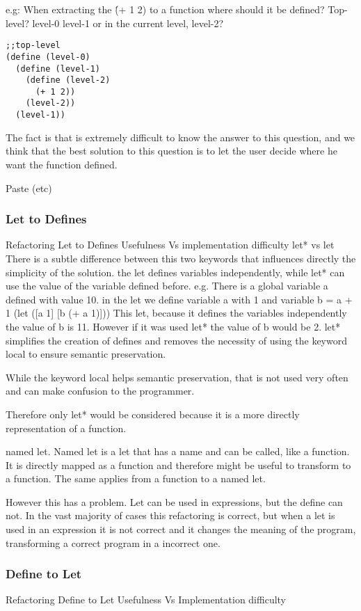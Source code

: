 e.g: When extracting the \'(+ 1 2) to a function where should it be defined?
Top-level? level-0 level-1 or in the current level, level-2?
\begin{lstlisting}[caption="Example"]
;;top-level
(define (level-0)
  (define (level-1)
    (define (level-2)
      (+ 1 2))
    (level-2))
  (level-1))
\end{lstlisting}

The fact is that is extremely difficult to know the answer to this question, and
we think that the best solution to this question is to let the user decide where
he want the function defined.

Paste (etc)

\subsubsection{Let to Defines}
Refactoring Let to Defines Usefulness Vs implementation difficulty
let* vs let
There is a subtle difference between this two keywords that influences directly the simplicity of the solution.
the let defines variables independently, while let* can use the value of the variable defined before.
e.g.
There is a global variable a defined with value 10.
in the let we define variable a with 1 and variable b = a + 1
(let ([a 1]
[b (+ a 1)]))
This let, because it defines the variables independently the value of b is 11.
However if it was used let* the value of b would be 2.
let* simplifies the creation of defines and removes the necessity of using the keyword local to ensure semantic preservation.

While the keyword local helps semantic preservation, that is not used very often and can make confusion to the programmer.

Therefore only let* would be considered because it is a more directly representation of a function.

named let.
Named let is a let that has a name and can be called, like a function.
It is directly mapped as a function and therefore might be useful to transform to a function.
The same applies from a function to a named let.

However this has a problem. Let can be used in expressions, but the define can not.
In the vast majority of cases this refactoring is correct, but when a let is used in an expression
it is not correct and it changes the meaning of the program, transforming a correct
program in a incorrect one.
\subsubsection{Define to Let}
Refactoring Define to Let Usefulness Vs Implementation difficulty

